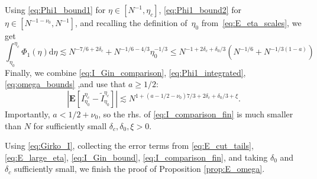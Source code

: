 \documentclass[10pt]{amsart}
\numberwithin{equation}{section}
\newcommand{\dif}{\mathrm{d}}
\newcommand{\E}{\mathbf{E}}
\begin{document}
Using \eqref{eq:Phi1_bound1} for $\eta\in [N^{-1},\eta_c]$, \eqref{eq:Phi1_bound2} for $\eta\in [N^{-1-\nu_0},N^{-1}]$, and recalling the definition of~$\eta_0$ from~\eqref{eq:E_eta_scales}, we get
\begin{equation}
\int_{\eta_0}^{\eta_c} \Phi_1(\eta)\dif \eta\lesssim N^{-7/6+2\delta_c} + N^{-1/6-4/3}\eta_0^{-1/3}\le N^{-1+2\delta_c+\delta_0/3}\left(N^{-1/6}+N^{-1/3(1-a)}\right)
\label{eq:Phi1_integrated}
\end{equation}
Finally, we combine \eqref{eq:I_Gin_comparison}, \eqref{eq:Phi1_integrated}, \eqref{eq:omega_bounds} ,and use that $a\ge 1/2$:
\begin{equation}
\left\vert\E \left[ I_{\eta_0}^{\eta_c}-\widetilde{I}_{\eta_0}^{\eta_c}\right]\right\vert \lesssim N^{1+(a-1/2-\nu_0)7/3 +2\delta_c+\delta_0/3+\xi}.
\label{eq:I_comparison_fin}
\end{equation}
Importantly, $a<1/2+\nu_0$, so the rhs. of \eqref{eq:I_comparison_fin} is much smaller than $N$ for sufficiently small $\delta_c,\delta_0,\xi>0$.

Using \eqref{eq:Girko_I}, collecting the error terms from \eqref{eq:E_cut_tails}, \eqref{eq:E_large_eta}, \eqref{eq:I_Gin_bound}, \eqref{eq:I_comparison_fin}, and taking $\delta_0$ and $\delta_c$ sufficiently small, we finish the proof of Proposition \ref{prop:E_omega}.
\end{document}
